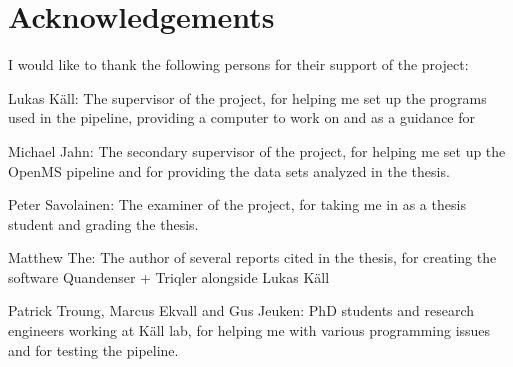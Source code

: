 \section{Acknowledgements}

I would like to thank the following persons for their support of the project:

Lukas Käll: The supervisor of the project, for helping me set up the programs used in the pipeline, providing a computer to work on and as a guidance for

Michael Jahn: The secondary supervisor of the project, for helping me set up the OpenMS pipeline and for providing the data sets analyzed in the thesis.

Peter Savolainen: The examiner of the project, for taking me in as a thesis student and grading the thesis.

Matthew The: The author of several reports cited in the thesis, for creating the software Quandenser + Triqler alongside Lukas Käll

Patrick Troung, Marcus Ekvall and Gus Jeuken: PhD students and research engineers working at Käll lab, for helping me with various programming issues and for testing the pipeline.
